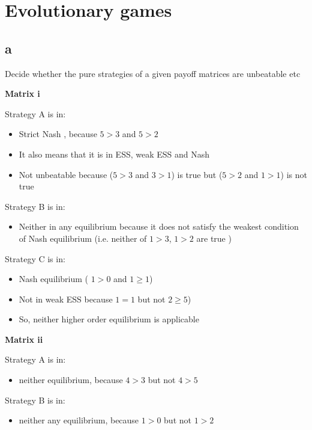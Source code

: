 \newcommand{\package}{\emph}

\setcounter{chapter}{1}
\setcounter{section}{0}
\section{Evolutionary games}

\subsection{a}

Decide whether the pure strategies of a given payoff matrices are unbeatable etc

\textbf{Matrix i}

Strategy A is in:
\begin{itemize}
\item Strict Nash , because $5>3$ and $5>2$ 
\item It also means that it is in ESS, weak ESS and Nash
\item Not unbeatable because ($5>3$ and $3>1$) is true but ($5>2$ and $1>1$) is not true
\end{itemize}

Strategy B is in:
\begin{itemize}
\item Neither in any equilibrium because it does not satisfy the weakest condition of Nash equilibrium (i.e. neither of $1>3$, $1>2$ are true )
\end{itemize}

Strategy C is in:
\begin{itemize}
\item Nash equilibrium ( $1>0$ and $1\geq 1$)
\item Not in weak ESS because $1=1$ but not $2\geq 5$)
\item So, neither higher order equilibrium is applicable
\end{itemize}

\textbf{Matrix ii}

Strategy A is in:
\begin{itemize}
\item neither equilibrium, because $4>3$ but not $4>5$
\end{itemize}

Strategy B is in:
\begin{itemize}
\item neither any equilibrium, because  $1>0$ but not $1>2$ 
\end{itemize}

